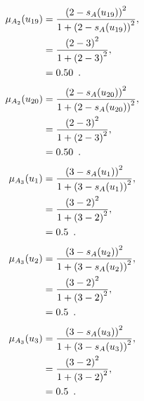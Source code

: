 \documentclass[a4paper,openany]{book}
\begin{document}
				\begin{align}
					\mu_{A_2}(u_{19}) &= \frac{\left(2-s_A(u_{19})\right)^2}{1 + \left(2-s_A(u_{19})\right)^2} ,\\
					&= \frac{\left(2-3\right)^2}{1 + \left(2-3\right)^2} \notag ,\\
					&= 0.50 \enspace. \notag
				\end{align}
				\begin{align}
					\mu_{A_2}(u_{20}) &= \frac{\left(2-s_A(u_{20})\right)^2}{1 + \left(2-s_A(u_{20})\right)^2} ,\\
					&= \frac{\left(2-3\right)^2}{1 + \left(2-3\right)^2} \notag ,\\
					&= 0.50 \enspace. \notag
				\end{align}
				\begin{align}
					\mu_{A_3}(u_1) &= \frac{\left(3-s_A(u_1)\right)^2}{1 + \left(3-s_A(u_1)\right)^2} ,\\
					&= \frac{\left(3-2\right)^2}{1 + \left(3-2\right)^2} \notag ,\\
					&= 0.5 \enspace. \notag
				\end{align}
				\begin{align}
					\mu_{A_3}(u_2) &= \frac{\left(3-s_A(u_2)\right)^2}{1 + \left(3-s_A(u_2)\right)^2} ,\\
					&= \frac{\left(3-2\right)^2}{1 + \left(3-2\right)^2} \notag ,\\
					&= 0.5 \enspace. \notag
				\end{align}
				\begin{align}
					\mu_{A_3}(u_3) &= \frac{\left(3-s_A(u_3)\right)^2}{1 + \left(3-s_A(u_3)\right)^2} ,\\
					&= \frac{\left(3-2\right)^2}{1 + \left(3-2\right)^2} \notag ,\\
					&= 0.5 \enspace. \notag
				\end{align}
\end{document}
